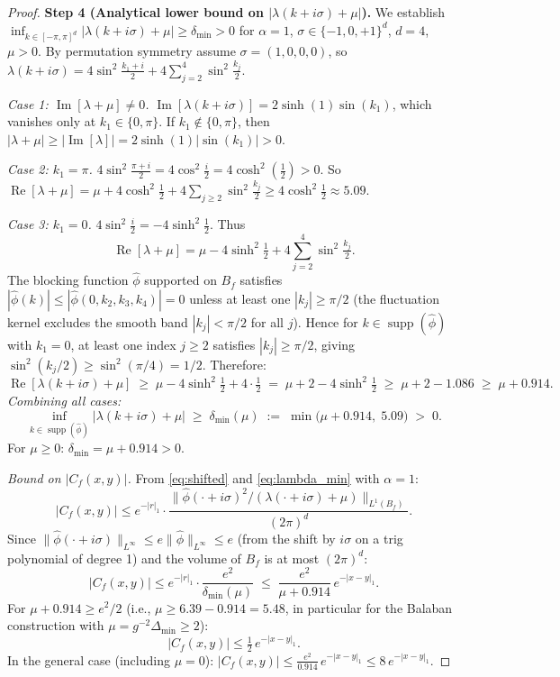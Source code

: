 \documentclass[11pt,a4paper]{amsart}
\theoremstyle{definition}
\newcommand{\Del}{\Delta_{\min}}
\newcommand{\Cf}{C_f}
\begin{document}
\begin{proof}
\textbf{Step 4 (Analytical lower bound on $|\lambda(k+i\sigma)+\mu|$).}
We establish $\inf_{k\in[-\pi,\pi]^d}|\lambda(k+i\sigma)+\mu|\ge \delta_{\min}>0$
for $\alpha=1$, $\sigma\in\{-1,0,+1\}^d$, $d=4$, $\mu>0$.
By permutation symmetry assume $\sigma = (1,0,0,0)$, so
$\lambda(k+i\sigma) = 4\sin^2\!\tfrac{k_1+i}{2} + 4\sum_{j=2}^4\sin^2\!\tfrac{k_j}{2}$.

\smallskip
\noindent\emph{Case 1: $\operatorname{Im}[\lambda+\mu]\ne 0$.}
$\operatorname{Im}[\lambda(k+i\sigma)] = 2\sinh(1)\sin(k_1)$,
which vanishes only at $k_1\in\{0,\pi\}$.
If $k_1\notin\{0,\pi\}$, then $|\lambda+\mu|\ge|\operatorname{Im}[\lambda]|
= 2\sinh(1)|\sin(k_1)|>0$.

\smallskip
\noindent\emph{Case 2: $k_1=\pi$.}
$4\sin^2\tfrac{\pi+i}{2} = 4\cos^2\tfrac{i}{2}=4\cosh^2(\tfrac{1}{2})>0$.
So $\operatorname{Re}[\lambda+\mu] = \mu + 4\cosh^2\!\tfrac{1}{2} + 4\sum_{j\ge 2}\sin^2\!\tfrac{k_j}{2}
\ge 4\cosh^2\!\tfrac{1}{2}\approx 5.09$.

\smallskip
\noindent\emph{Case 3: $k_1=0$.}
$4\sin^2\tfrac{i}{2}=-4\sinh^2\!\tfrac{1}{2}$.
Thus
\[
  \operatorname{Re}[\lambda+\mu]
  = \mu - 4\sinh^2\!\tfrac{1}{2}
    + 4\sum_{j=2}^4\sin^2\!\tfrac{k_j}{2}.
\]
The blocking function $\hat\phi$ supported on $B_f$ satisfies
$|\hat\phi(k)|\le |\hat\phi(0,k_2,k_3,k_4)| = 0$ unless at least one $|k_j|\ge\pi/2$
(the fluctuation kernel excludes the smooth band $|k_j|<\pi/2$ for all $j$).
Hence for $k\in\operatorname{supp}(\hat\phi)$ with $k_1=0$,
at least one index $j\ge 2$ satisfies $|k_j|\ge\pi/2$, giving
$\sin^2(k_j/2)\ge\sin^2(\pi/4)=1/2$.
Therefore:
\[
  \operatorname{Re}[\lambda(k+i\sigma)+\mu]
  \;\ge\;
  \mu - 4\sinh^2\!\tfrac{1}{2} + 4\cdot\tfrac{1}{2}
  \;=\;
  \mu + 2 - 4\sinh^2\!\tfrac{1}{2}
  \;\ge\;
  \mu + 2 - 1.086
  \;\ge\;
  \mu + 0.914.
\]
\emph{Combining all cases:}
\begin{equation}
\label{eq:lambda_min}
  \inf_{k\in\operatorname{supp}(\hat\phi)}|\lambda(k+i\sigma)+\mu|
  \;\ge\;
  \delta_{\min}(\mu) \;:=\; \min\!\bigl(\mu + 0.914,\; 5.09\bigr)
  \;>\; 0.
\end{equation}
For $\mu\ge 0$: $\delta_{\min} = \mu+0.914 > 0$.

\smallskip
\noindent\emph{Bound on $|\Cf(x,y)|$.}
From \eqref{eq:shifted} and \eqref{eq:lambda_min} with $\alpha=1$:
\[
  |\Cf(x,y)|
  \le e^{-|r|_1}
    \cdot \frac{\|\hat\phi(\cdot+i\sigma)^2/(\lambda(\cdot+i\sigma)+\mu)\|_{L^1(B_f)}}
               {(2\pi)^d}.
\]
Since $\|\hat\phi(\cdot+i\sigma)\|_{L^\infty}\le e\|\hat\phi\|_{L^\infty}\le e$
(from the shift by $i\sigma$ on a trig polynomial of degree 1)
and the volume of $B_f$ is at most $(2\pi)^d$:
\[
  |\Cf(x,y)|
  \le e^{-|r|_1}\cdot\frac{e^2}{\delta_{\min}(\mu)}
  \;\le\;
  \frac{e^2}{\mu+0.914}\,e^{-|x-y|_1}.
\]
For $\mu+0.914\ge e^2/2$ (i.e., $\mu\ge 6.39-0.914=5.48$, in particular
for the Balaban construction with $\mu=g^{-2}\Del\ge 2$):
\[
  |\Cf(x,y)|\le \tfrac{1}{2}\,e^{-|x-y|_1}.
\]
In the general case (including $\mu=0$):
$|\Cf(x,y)|\le \tfrac{e^2}{0.914}\,e^{-|x-y|_1}\le 8\,e^{-|x-y|_1}$.


\end{proof}
\end{document}
